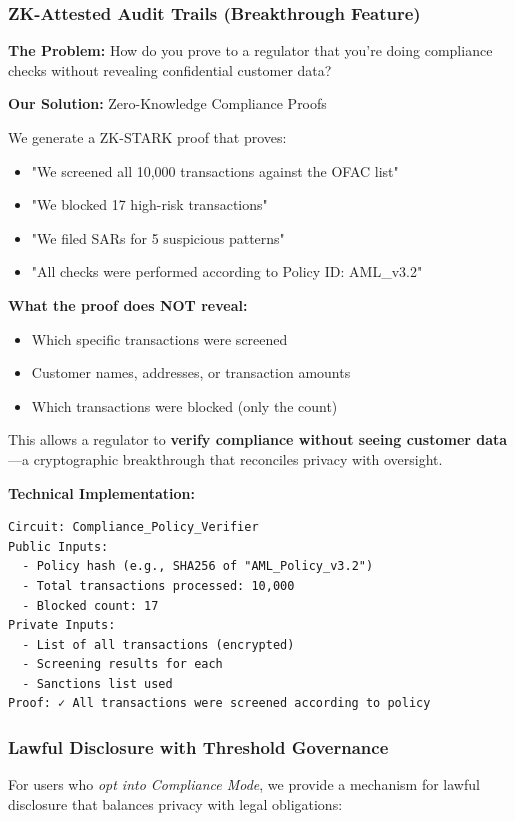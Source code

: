 \documentclass[11pt,a4paper]{article}
\begin{document}
\subsubsection{ZK-Attested Audit Trails (Breakthrough Feature)}

\textbf{The Problem:} How do you prove to a regulator that you're doing compliance checks without revealing confidential customer data?

\textbf{Our Solution:} Zero-Knowledge Compliance Proofs

We generate a ZK-STARK proof that proves:
\begin{itemize}
    \item "We screened all 10,000 transactions against the OFAC list"
    \item "We blocked 17 high-risk transactions"
    \item "We filed SARs for 5 suspicious patterns"
    \item "All checks were performed according to Policy ID: AML\_v3.2"
\end{itemize}

\textbf{What the proof does NOT reveal:}
\begin{itemize}
    \item Which specific transactions were screened
    \item Customer names, addresses, or transaction amounts
    \item Which transactions were blocked (only the count)
\end{itemize}

This allows a regulator to \textbf{verify compliance without seeing customer data}—a cryptographic breakthrough that reconciles privacy with oversight.

\textbf{Technical Implementation:}
\begin{verbatim}
Circuit: Compliance_Policy_Verifier
Public Inputs:
  - Policy hash (e.g., SHA256 of "AML_Policy_v3.2")
  - Total transactions processed: 10,000
  - Blocked count: 17
Private Inputs:
  - List of all transactions (encrypted)
  - Screening results for each
  - Sanctions list used
Proof: ✓ All transactions were screened according to policy
\end{verbatim}

\subsubsection{Lawful Disclosure with Threshold Governance}

For users who \textit{opt into Compliance Mode}, we provide a mechanism for lawful disclosure that balances privacy with legal obligations:
\end{document}
